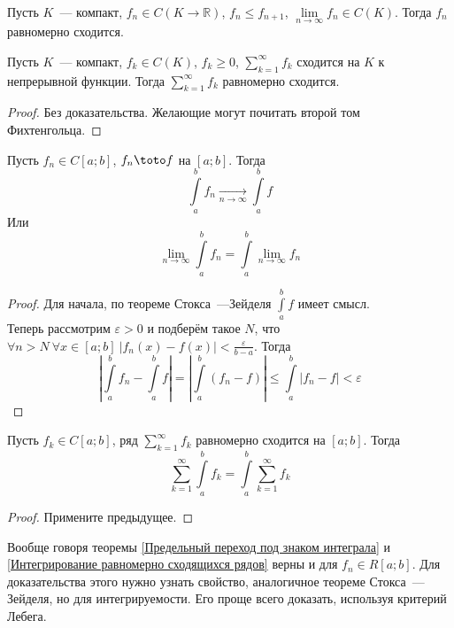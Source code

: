 \documentclass{article}
\let\eps\varepsilon
\begin{document}
    \begin{theorem}
        Пусть $K$~--- компакт, $f_n\in C(K\to\mathbb R)$, $f_n\leqslant f_{n+1}$, $\lim\limits_{n\to\infty}f_n\in C(K)$. Тогда $f_n$ равномерно сходится.
    \end{theorem}
    \begin{theorem}
        Пусть $K$~--- компакт, $f_k\in C(K)$, $f_k\geqslant0$, $\sum\limits_{k=1}^\infty f_k$ сходится на $K$ к непрерывной функции. Тогда $\sum\limits_{k=1}^\infty f_k$ равномерно сходится.
    \end{theorem}
    \begin{proof}
        Без доказательства. Желающие могут почитать второй том Фихтенгольца.
    \end{proof}
    \begin{theorem}
        \label{Предельный переход под знаком интеграла}
        Пусть $f_n\in C[a;b]$, $f_n\toto f$ на $[a;b]$. Тогда
        $$
        \int\limits_a^bf_n\underset{n\to\infty}\longrightarrow\int\limits_a^bf
        $$
        Или
        $$
        \lim\limits_{n\to\infty}\int\limits_a^bf_n=\int\limits_a^b\lim\limits_{n\to\infty}f_n
        $$
    \end{theorem}
    \begin{proof}
        Для начала, по теореме Стокса~---Зейделя $\int\limits_a^bf$ имеет смысл.\\
        Теперь рассмотрим $\eps>0$ и подберём такое $N$, что $\forall n>N~\forall x\in[a;b]~|f_n(x)-f(x)|<\frac\eps{b-a}$. Тогда
        $$
        \left|\int\limits_a^bf_n-\int\limits_a^bf\right|=\left|\int\limits_a^b(f_n-f)\right|\leqslant\int\limits_a^b|f_n-f|<\eps
        $$
    \end{proof}
    \begin{theorem}
        \label{Интегрирование равномерно сходящихся рядов}
        Пусть $f_k\in C[a;b]$, ряд $\sum\limits_{k=1}^\infty f_k$ равномерно сходится на $[a;b]$. Тогда
        $$
        \sum\limits_{k=1}^\infty\int\limits_a^bf_k=\int\limits_a^b\sum\limits_{k=1}^\infty f_k
        $$
    \end{theorem}
    \begin{proof}
        Примените предыдущее.
    \end{proof}
    \begin{remark}
        Вообще говоря теоремы \ref{Предельный переход под знаком интеграла} и \ref{Интегрирование равномерно сходящихся рядов} верны и для $f_n\in R[a;b]$. Для доказательства этого нужно узнать свойство, аналогичное теореме Стокса~--- Зейделя, но для интегрируемости. Его проще всего доказать, используя критерий Лебега.
    \end{remark}
\end{document}
